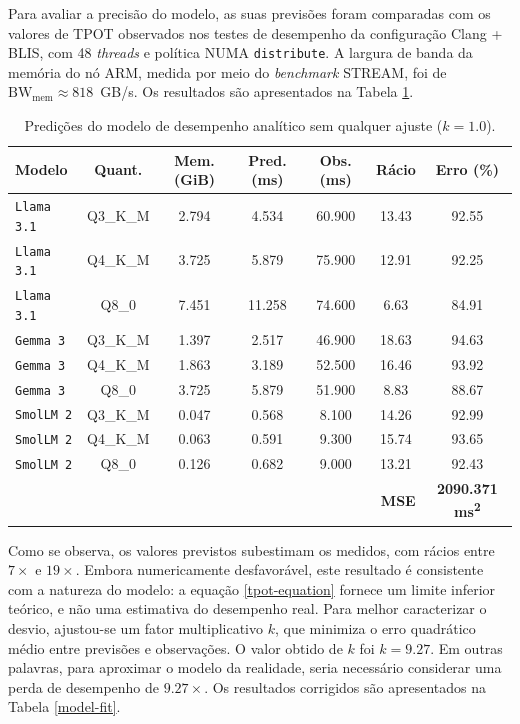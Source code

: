 \documentclass[11pt, a4paper]{article}
\begin{document}
Para avaliar a precisão do modelo, as suas previsões foram comparadas com os valores de TPOT
observados nos testes de desempenho da configuração Clang + BLIS, com 48 \emph{threads} e política
NUMA \texttt{distribute}. A largura de banda da memória do nó ARM, medida por meio do
\emph{benchmark} STREAM, foi de \mbox{$\text{BW}_{\text{mem}} \approx 818$ GB/s}. Os resultados
são apresentados na Tabela \ref{model-floor}.

\begin{table}[H]
    \centering
    \begin{tabular}{|l|c|c|c|c|c|c|}
        \hline
        \textbf{Modelo}     &
        \textbf{Quant.}     &
        \textbf{Mem. (GiB)} &
        \textbf{Pred. (ms)} &
        \textbf{Obs. (ms)}  &
        \textbf{Rácio}      &
        \textbf{Erro (\%)}  \\ \hline

        \texttt{Llama 3.1} & Q3\_K\_M &  2.794 &   4.534 & 60.900 & 13.43 & 92.55 \\ \hline
        \texttt{Llama 3.1} & Q4\_K\_M &  3.725 &   5.879 & 75.900 & 12.91 & 92.25 \\ \hline
        \texttt{Llama 3.1} & Q8\_0    &  7.451 &  11.258 & 74.600 &  6.63 & 84.91 \\ \hline
        \texttt{Gemma 3}   & Q3\_K\_M &  1.397 &   2.517 & 46.900 & 18.63 & 94.63 \\ \hline
        \texttt{Gemma 3}   & Q4\_K\_M &  1.863 &   3.189 & 52.500 & 16.46 & 93.92 \\ \hline
        \texttt{Gemma 3}   & Q8\_0    &  3.725 &   5.879 & 51.900 &  8.83 & 88.67 \\ \hline
        \texttt{SmolLM 2}  & Q3\_K\_M &  0.047 &   0.568 &  8.100 & 14.26 & 92.99 \\ \hline
        \texttt{SmolLM 2}  & Q4\_K\_M &  0.063 &   0.591 &  9.300 & 15.74 & 93.65 \\ \hline
        \texttt{SmolLM 2}  & Q8\_0    &  0.126 &   0.682 &  9.000 & 13.21 & 92.43 \\ \hline

        \multicolumn{6}{|r|}{\textbf{MSE}} & \textbf{2090.371 ms\textsuperscript{2}} \\ \hline
    \end{tabular}
    \caption{Predições do modelo de desempenho analítico sem qualquer ajuste ($k = 1.0$).}
    \label{model-floor}
\end{table}

Como se observa, os valores previstos subestimam os medidos, com rácios entre $7\times$ e
$19\times$. Embora numericamente desfavorável, este resultado é consistente com a natureza do
modelo: a equação \ref{tpot-equation} fornece um limite inferior teórico, e não uma estimativa do
desempenho real. Para melhor caracterizar o desvio, ajustou-se um fator multiplicativo $k$, que
minimiza o erro quadrático médio entre previsões e observações. O valor obtido de $k$ foi
$k = 9.27$. Em outras palavras, para aproximar o modelo da realidade, seria necessário considerar
uma perda de desempenho de $9.27\times$. Os resultados corrigidos são apresentados na Tabela
\ref{model-fit}.
\end{document}
